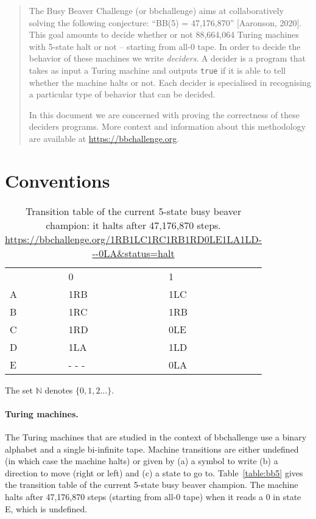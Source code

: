 \documentclass[a4paper,british]{article}
\begin{document}
\date{}
\maketitle

\begin{abstract}
  The Busy Beaver Challenge (or bbchallenge) aims at collaboratively solving the following conjecture: ``BB(5) = 47,176,870'' [Aaronson, 2020]\nocite{BusyBeaverFrontier}. This goal amounts to decide whether or not 88,664,064 Turing machines with 5-state halt or not -- starting from all-0 tape. In order to decide the behavior of these machines we write \textit{deciders}. A decider is a program that takes as input a Turing machine and outputs \texttt{true} if it is able to tell whether the machine halts or not. Each decider is specialised in recognising a particular type of behavior that can be decided.

  In this document we are concerned with proving the correctness of these deciders programs. More context and information about this methodology are available at \url{https://bbchallenge.org}.
\end{abstract}
\tableofcontents

\section{Conventions}

\begin{table}[h!]
  \centering
  \begin{tabular}{lll}
      & 0     & 1   \\
    A & 1RB   & 1LC \\
    B & 1RC   & 1RB \\
    C & 1RD   & 0LE \\
    D & 1LA   & 1LD \\
    E & - - - & 0LA
  \end{tabular}
  \caption{Transition table of the current 5-state busy beaver champion: it halts after 47,176,870 steps.\\\url{https://bbchallenge.org/1RB1LC1RC1RB1RD0LE1LA1LD---0LA&status=halt}}
\end{table}\label{table:bb5}

The set $\mathbb{N}$ denotes $\{0,1,2\dots\}$.

\paragraph*{Turing machines.}The Turing machines that are studied in the context of bbchallenge use a binary alphabet and a single bi-infinite tape. Machine transitions are either undefined (in which case the machine halts) or given by (a) a symbol to write (b) a direction to move (right or left) and (c) a state to go to. Table~\ref{table:bb5} gives the transition table of the current 5-state busy beaver champion. The machine halts after 47,176,870 steps (starting from all-0 tape) when it reads a 0 in state E, which is undefined.
\end{document}
